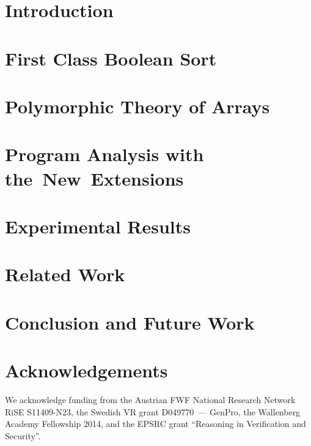 \section{Introduction}
\label{sect:introduction}



\section{First Class Boolean Sort}
\label{sect:fool}



\section{Polymorphic Theory of Arrays}
\label{sect:arrays}



\section[Program Analysis with the~New~Extensions]{Program Analysis with\\the~New~Extensions}
\label{sect:example}



\section{Experimental Results}
\label{sect:experiments}



\section{Related Work}
\label{sect:related}



\section{Conclusion and Future Work}
\label{sect:future}



\section*{Acknowledgements}
We acknowledge funding from the Austrian FWF National Research Network RiSE
S11409-N23, the Swedish VR grant D049770~--- GenPro, the
Wallenberg Academy Fellowship 2014, and the EPSRC grant ``Reasoning in Verification and Security''.